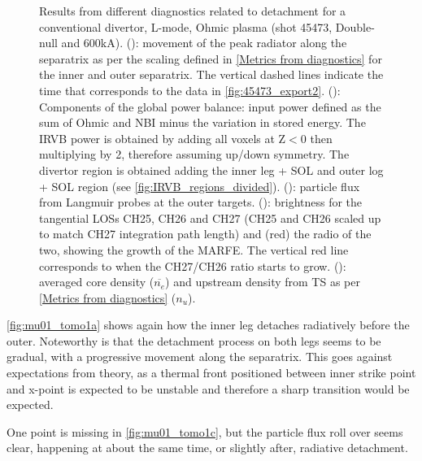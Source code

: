\begin{figure}
     \vspace*{-3mm}
     \caption{Results from different diagnostics related to detachment for a conventional divertor, L-mode, Ohmic plasma (shot 45473, Double-null and 600kA). (): movement of the peak radiator along the separatrix as per the scaling defined in \autoref{Metrics from diagnostics} for the inner and outer separatrix. The vertical dashed lines indicate the time that corresponds to the data in \autoref{fig:45473_export2}. (): Components of the global power balance: input power defined as the sum of Ohmic and NBI minus the variation in stored energy. The IRVB power is obtained by adding all voxels at Z$<$0 then multiplying by 2, therefore assuming up/down symmetry. The divertor region is obtained adding the inner leg + SOL and outer log + SOL region (see \autoref{fig:IRVB_regions_divided}). (): particle flux from Langmuir probes at the outer targets. (): brightness for the tangential LOSs CH25, CH26 and CH27 (CH25 and CH26 scaled up to match CH27 integration path length) and (red) the radio of the two, showing the growth of the MARFE. The vertical red line corresponds to when the CH27/CH26 ratio starts to grow. (): averaged core density ($\overline{n_e}$) and upstream density from TS as per \autoref{Metrics from diagnostics} ($n_u$).}
	\label{fig:mu01_tomo1}
\end{figure}
\autoref{fig:mu01_tomo1a} shows again how the inner leg detaches radiatively before the outer. Noteworthy is that the detachment process on both legs seems to be gradual, with a progressive movement along the separatrix. This goes against expectations from theory, as a thermal front positioned between inner strike point and x-point is expected to be unstable and therefore a sharp transition would be expected.\cite{Lipschultz2016}

One point is missing in \autoref{fig:mu01_tomo1c}, but the particle flux roll over seems clear, happening at about the same time, or slightly after, radiative detachment.

